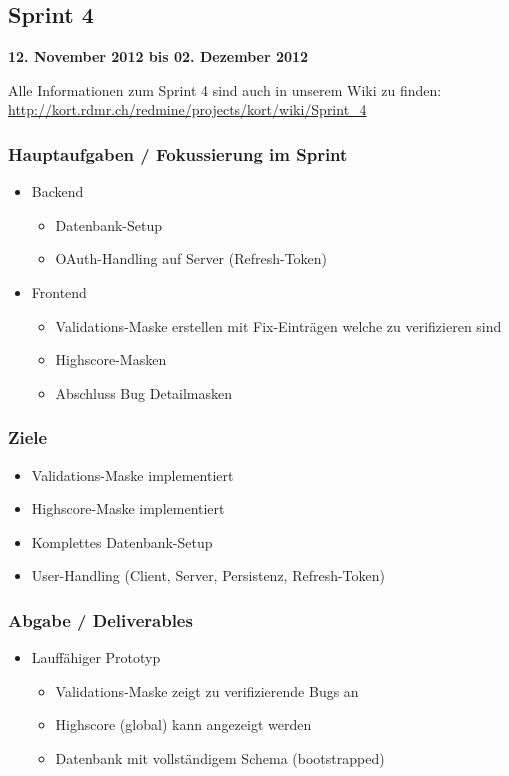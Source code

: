 \subsection{Sprint 4}

\textbf{12. November 2012 bis 02. Dezember 2012}

Alle Informationen zum Sprint 4 sind auch in unserem Wiki zu finden:
\url{http://kort.rdmr.ch/redmine/projects/kort/wiki/Sprint_4}

\subsubsection{Hauptaufgaben / Fokussierung im Sprint}

\begin{itemize}
	\item Backend
	\begin{itemize}
		\item Datenbank-Setup
		\item OAuth-Handling auf Server (Refresh-Token)
	\end{itemize}
	\item Frontend
	\begin{itemize}
		\item Validations-Maske erstellen mit Fix-Einträgen welche zu verifizieren sind
		\item Highscore-Masken
		\item Abschluss Bug Detailmasken
	\end{itemize}
\end{itemize}

\subsubsection{Ziele}
\begin{itemize}
	\item Validations-Maske implementiert
	\item Highscore-Maske implementiert
	\item Komplettes Datenbank-Setup
	\item User-Handling (Client, Server, Persistenz, Refresh-Token)
\end{itemize}

\subsubsection{Abgabe / Deliverables}

\begin{itemize}
	\item Lauffähiger Prototyp
	\begin{itemize}
		\item Validations-Maske zeigt zu verifizierende Bugs an
		\item Highscore (global) kann angezeigt werden
		\item Datenbank mit vollständigem Schema (bootstrapped)
	\end{itemize}
\end{itemize}

